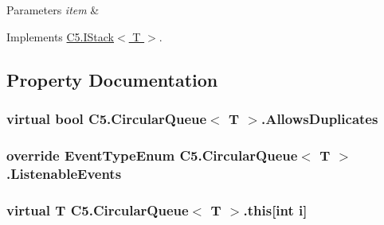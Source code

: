 \begin{DoxyParams}{Parameters}
{\em item} & \\
\hline
\end{DoxyParams}


Implements \hyperlink{interface_c5_1_1_i_stack_a98462dd9cda5d818fc1bce6a5055f000}{C5.\+I\+Stack$<$ T $>$}.



\subsection{Property Documentation}
\hypertarget{class_c5_1_1_circular_queue_a0146f541106c3d6cf4259a1a6fe61d9c}{}
\subsubsection[{Allows\+Duplicates}]{\setlength{\rightskip}{0pt plus 5cm}virtual bool {\bf C5.\+Circular\+Queue}$<$ T $>$.Allows\+Duplicates\hspace{0.3cm}{\ttfamily [get]}}\label{class_c5_1_1_circular_queue_a0146f541106c3d6cf4259a1a6fe61d9c}




\hypertarget{class_c5_1_1_circular_queue_a2dc39118f0d30f1bae7d3a73d4d2e4c6}{}
\subsubsection[{Listenable\+Events}]{\setlength{\rightskip}{0pt plus 5cm}override {\bf Event\+Type\+Enum} {\bf C5.\+Circular\+Queue}$<$ T $>$.Listenable\+Events\hspace{0.3cm}{\ttfamily [get]}}\label{class_c5_1_1_circular_queue_a2dc39118f0d30f1bae7d3a73d4d2e4c6}




\hypertarget{class_c5_1_1_circular_queue_a26b24b8ca3560860d09710dc8e8409bb}{}
\subsubsection[{this[int i]}]{\setlength{\rightskip}{0pt plus 5cm}virtual T {\bf C5.\+Circular\+Queue}$<$ T $>$.this\mbox{[}int i\mbox{]}\hspace{0.3cm}{\ttfamily [get]}}\label{class_c5_1_1_circular_queue_a26b24b8ca3560860d09710dc8e8409bb}


